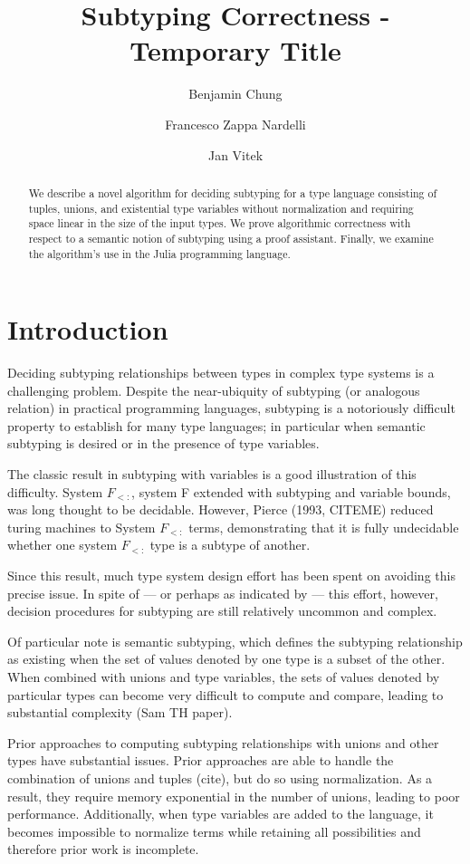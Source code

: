 \documentclass[a4paper,UKenglish]{lipics-v2018}
\title{Subtyping Correctness - Temporary Title}
\author{Benjamin Chung}{Northeastern University}{bchung@ccs.neu.edu}{}{}%
\author{Francesco Zappa Nardelli}{Inria}{}{}{}
\author{Jan Vitek}{Northeastern University \& Czech Technical University}{}{}{}
\begin{document}
\maketitle
\begin{abstract}
We describe a novel algorithm for deciding subtyping for a type language consisting
of tuples, unions, and existential type variables without normalization and requiring
space linear in the size of the input types. We prove algorithmic correctness with 
respect to a semantic notion of subtyping using a proof assistant. Finally, we examine
the algorithm's use in the Julia programming language.
\end{abstract}

\section{Introduction}

Deciding subtyping relationships between types in complex type systems is  a
challenging problem. Despite the near-ubiquity of subtyping (or analogous
relation)  in practical programming languages, subtyping is a notoriously
difficult property to  establish for many type languages; in particular when
semantic subtyping is desired or in the presence of type variables.

The classic result in subtyping with variables is a good illustration of this
difficulty. System $F_{<:}$, system F extended with subtyping and variable
bounds, was long thought to be decidable. However, Pierce (1993, CITEME)
reduced turing machines to System $F_{<:}$ terms, demonstrating that it is
fully undecidable whether one system $F_{<:}$ type is a subtype of another.

Since this result, much type system design effort has been spent on avoiding
this precise issue. In spite of --- or perhaps as indicated by --- this
effort, however, decision  procedures for subtyping are still relatively
uncommon and complex.

Of particular note is semantic subtyping, which defines the subtyping
relationship as existing when the set of values denoted by one type is a
subset of the other. When combined with unions and type variables, the
sets of values denoted by particular types can become very difficult to compute
and compare, leading to substantial complexity (Sam TH paper).

Prior approaches to computing subtyping relationships with unions and other
types have substantial issues. Prior approaches are able to handle the
combination of unions and tuples (cite), but do so using normalization. As a
result, they require memory exponential in the number of unions, leading to
poor performance. Additionally, when type variables are added to the language,
it becomes impossible to normalize terms while retaining all possibilities and
therefore prior work is incomplete.
\end{document}
